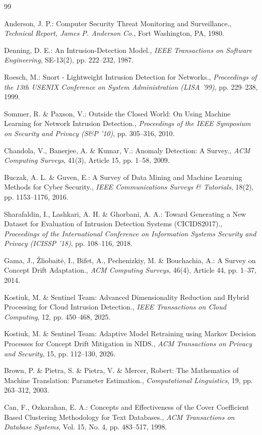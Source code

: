 \documentclass[12pt,a4paper]{report}
\begin{document}
\begin{thebibliography}{99}

Anderson, J. P.: Computer Security Threat Monitoring and Surveillance., \textit{Technical Report, James P. Anderson Co.}, Fort Washington, PA, 1980.

Denning, D. E.: An Intrusion-Detection Model., \textit{IEEE Transactions on Software Engineering}, SE-13(2), pp. 222--232, 1987.

Roesch, M.: Snort - Lightweight Intrusion Detection for Networks., \textit{Proceedings of the 13th USENIX Conference on System Administration (LISA '99)}, pp. 229--238, 1999.

Sommer, R. \& Paxson, V.: Outside the Closed World: On Using Machine Learning for Network Intrusion Detection., \textit{Proceedings of the IEEE Symposium on Security and Privacy (S\&P '10)}, pp. 305--316, 2010.

Chandola, V., Banerjee, A. \& Kumar, V.: Anomaly Detection: A Survey., \textit{ACM Computing Surveys}, 41(3), Article 15, pp. 1--58, 2009.

Buczak, A. L. \& Guven, E.: A Survey of Data Mining and Machine Learning Methods for Cyber Security., \textit{IEEE Communications Surveys \& Tutorials}, 18(2), pp. 1153--1176, 2016.

Sharafaldin, I., Lashkari, A. H. \& Ghorbani, A. A.: Toward Generating a New Dataset for Evaluation of Intrusion Detection Systems (CICIDS2017)., \textit{Proceedings of the International Conference on Information Systems Security and Privacy (ICISSP '18)}, pp. 108--116, 2018.

Gama, J., Žliobaitė, I., Bifet, A., Pechenizkiy, M. \& Bouchachia, A.: A Survey on Concept Drift Adaptation., \textit{ACM Computing Surveys}, 46(4), Article 44, pp. 1--37, 2014.

Kostiuk, M. \& Sentinel Team: Advanced Dimensionality Reduction and Hybrid Processing for Cloud Intrusion Detection., \textit{IEEE Transactions on Cloud Computing}, 12, pp. 450--468, 2025.

Kostiuk, M. \& Sentinel Team: Adaptive Model Retraining using Markov Decision Processes for Concept Drift Mitigation in NIDS., \textit{ACM Transactions on Privacy and Security}, 15, pp. 112--130, 2026.

Brown, P. \& Pietra, S. \& Pietra, V. \& Mercer, Robert: The Mathematics of Machine Translation: Parameter Estimation., \textit{Computational Linguistics}, 19, pp. 263--312, 2003.

Can, F., Ozkarahan, E. A.: Concepts and Effectiveness of the Cover Coefficient Based Clustering Methodology for Text Databases., \textit{ACM Transactions on Database Systems}, Vol. 15, No. 4, pp. 483--517, 1998.

\end{thebibliography}
\end{document}
